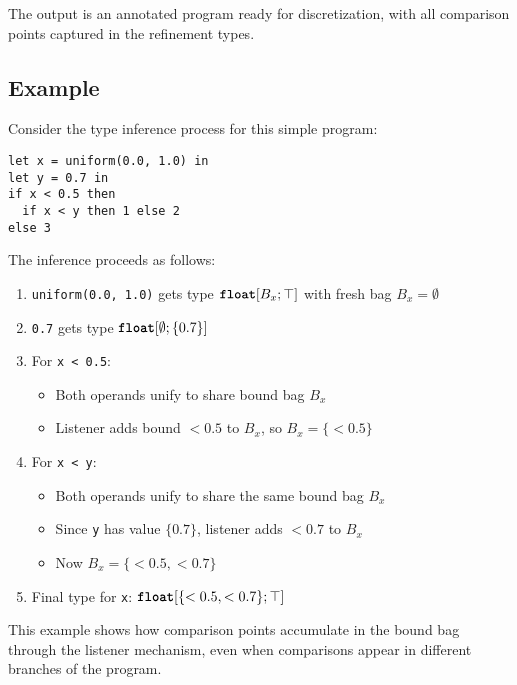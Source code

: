 The output is an annotated program ready for discretization, with all comparison points captured in the refinement types.

\subsection{Example}

Consider the type inference process for this simple program:
\begin{lstlisting}
let x = uniform(0.0, 1.0) in
let y = 0.7 in
if x < 0.5 then 
  if x < y then 1 else 2
else 3
\end{lstlisting}

The inference proceeds as follows:
\begin{enumerate}
    \item \texttt{uniform(0.0, 1.0)} gets type $\text{\ttfamily\bfseries float}[B_x; \top]$ with fresh bag $B_x = \emptyset$
    \item \texttt{0.7} gets type $\text{\ttfamily\bfseries float}[\emptyset; \{0.7\}]$
    \item For \texttt{x < 0.5}:
        \begin{itemize}
            \item Both operands unify to share bound bag $B_x$
            \item Listener adds bound $<0.5$ to $B_x$, so $B_x = \{<0.5\}$
        \end{itemize}
    \item For \texttt{x < y}:
        \begin{itemize}
            \item Both operands unify to share the same bound bag $B_x$
            \item Since \texttt{y} has value $\{0.7\}$, listener adds $<0.7$ to $B_x$
            \item Now $B_x = \{<0.5, <0.7\}$
        \end{itemize}
    \item Final type for \texttt{x}: $\text{\ttfamily\bfseries float}[\{<0.5, <0.7\}; \top]$
\end{enumerate}

This example shows how comparison points accumulate in the bound bag through the listener mechanism, even when comparisons appear in different branches of the program.

